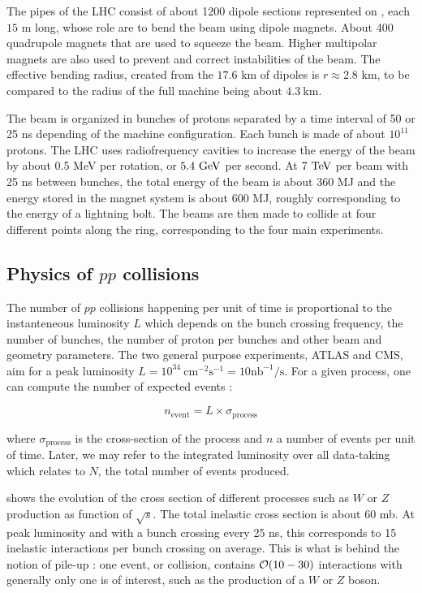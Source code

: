    The pipes of the LHC consist of about 1200 dipole sections represented on
    , each $15$ m long, whose role are to bend the beam using dipole
    magnets. About 400 quadrupole magnets that are used to squeeze the
    beam. Higher multipolar magnets are also used to prevent and correct instabilities of
    the beam. The effective bending radius, created from the $17.6$ km of dipoles is
    $r \approx 2.8$ km, to be compared to the radius of the full machine being about $4.3~\text{km}$.

    The beam is organized in bunches of protons separated by a time interval of 50 or
    25 ns depending of the machine configuration. Each bunch is made of about $10^{11}$
    protons. The LHC uses radiofrequency cavities to increase the energy of the beam by
    about 0.5 MeV per rotation, or $5.4~\text{GeV}$ per second. At $7~\text{TeV}$ per beam with 25 ns
    between bunches, the total energy of the beam is about 360 MJ and the energy stored
    in the magnet system is about 600 MJ, roughly corresponding to the energy of a
    lightning bolt. The beams are then made to collide at four different points along the
    ring, corresponding to the four main experiments.

        \subsection{Physics of $pp$ collisions \label{sec:physicsFromCollisionsAtTheLHC}}

    The number of $pp$ collisions happening per unit of time is proportional to the
    instanteneous luminosity $L$ which depends on the bunch crossing frequency, the
    number of bunches, the number of proton per bunches and other beam and geometry parameters.
    The two general purpose experiments, ATLAS and CMS, aim for a peak luminosity
    $ L = 10^{34}~\text{cm}^{-2} \text{s}^{-1} = 10 \text{nb}^{-1} / \text{s}$. For a
    given process, one can compute the number of expected events :

    $$ n_\text{event} = L \times \sigma_\text{process} $$

    where $\sigma_\text{process}$ is the cross-section of the process and $n$ a number
    of events per unit of time. Later, we may refer to the integrated luminosity over all
    data-taking which relates to $N$, the total number of events produced.

     shows the evolution of the cross section of different
    processes such as $W$ or $Z$ production as function of $\sqrt{s}$. The total inelastic
    cross section is about
    60 mb. At peak luminosity and with a bunch crossing every 25 ns, this corresponds
    to 15 inelastic interactions per bunch crossing on average. This is what is behind
    the notion of pile-up : one event, or collision, contains $\mathcal{O}(10-30)$
    interactions with generally only one is of interest, such as the production of a $W$
    or $Z$ boson.

